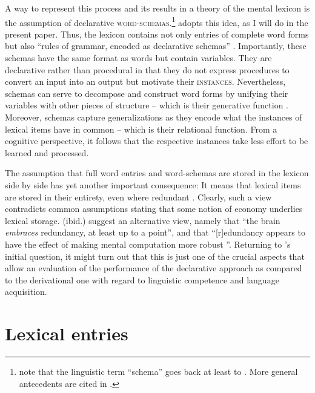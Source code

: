 \documentclass[output=paper,colorlinks,citecolor=brown,
]{langscibook}
\begin{document}
A way to represent this process and its results in a theory of the mental lexicon is the assumption of declarative \textsc{word-schemas}.\footnote{\citet[471]{Jackendoff.Audring2016} note that the linguistic term ``schema'' goes back at least to \citet{Bybee.Slobin1982}. More general antecedents are cited in \citet{Rumelhart1980}.} \citet{Zimmermann2019} adopts this idea, as I will do in the present paper. Thus, the lexicon contains not only entries of complete word forms but also ``rules of grammar, encoded as declarative schemas'' \citep[467]{Jackendoff.Audring2016}. Importantly, these schemas have the same format as words but contain variables. They are declarative rather than procedural in that they do not express procedures to convert an input into an output but motivate their \textsc{instances}. Nevertheless, schemas can serve to decompose and construct word forms by unifying their variables with other pieces of structure -- which is their generative function \citep[472]{Jackendoff.Audring2016}. Moreover, schemas capture generalizations as they encode what the instances of lexical items have in common -- which is their relational function. From a cognitive perspective, it follows that the respective instances take less effort to be learned and processed.

The assumption that full word entries and word-schemas are stored in the lexicon side by side has yet another important consequence: It means that lexical items are stored in their entirety, even where redundant \parencite[see][476]{Jackendoff.Audring2016}. Clearly, such a view contradicts common assumptions stating that some notion of economy underlies lexical storage. \citeauthor{Jackendoff.Audring2016} (ibid.) suggest an alternative view, namely that ``the brain \textit{embraces} redundancy, at least up to a point'', and that ``[r]edundancy appears to have the effect of making mental computation more robust \citep[6]{Libben2007}''. Returning to \citeauthor{Zimmermann2019}'s initial question, it might turn out that this is just one of the crucial aspects that allow an evaluation of the performance of the declarative approach as compared to the derivational one with regard to linguistic competence and language acquisition.


\section{Lexical entries}\label{sec:LexEntries}
\end{document}
